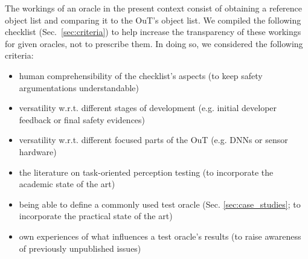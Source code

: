 \documentclass[conference]{IEEEtran}
\begin{document}
The workings of an oracle in the present context consist of obtaining a reference object list and comparing it to the OuT's object list. 
We compiled the following checklist (Sec.~\ref{sec:criteria}) to help increase the transparency of these workings for given oracles, not to prescribe them.
In doing so, we considered the following criteria: %
\begin{itemize}
\item human comprehensibility of the checklist's aspects \newline (to keep safety argumentations understandable)
\item versatility w.r.t. different stages of development \newline (e.g. initial developer feedback or final safety evidences)
\item versatility w.r.t. different focused parts of the OuT \newline (e.g. DNNs or sensor hardware)
\item the literature on task-oriented perception testing \newline (to incorporate the academic state of the art)
\item being able to define a commonly used test oracle \newline (Sec. \ref{sec:case_studies}; to incorporate the practical state of the art)
\item own experiences of what influences a test oracle's results
(to raise awareness of previously unpublished issues)


\end{itemize}



\end{document}
